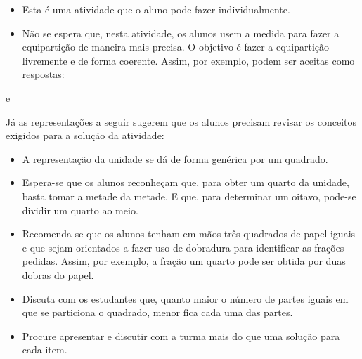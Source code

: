 \begin{multicols}{2}
  \begin{itemize} %
    \item       Esta é uma atividade que o aluno pode fazer individualmente.
    \item       Não se espera que, nesta atividade, os alunos usem a medida para fazer a equipartição de maneira mais precisa. O objetivo é fazer a equipartição livremente e de forma coerente. Assim, por exemplo, podem ser aceitas como respostas:
\end{itemize} %
\begin{center}
e
\end{center}
  Já as representações a seguir sugerem que os alunos precisam revisar os conceitos exigidos para a solução da atividade:
\begin{center}
\end{center}
\begin{itemize} %
    \item       A representação da unidade se dá de forma genérica por um quadrado.
    \item       Espera-se que os alunos reconheçam que, para obter um quarto da unidade, basta tomar a metade da metade. E que, para determinar um oitavo, pode-se dividir um quarto ao meio.
    \item       Recomenda-se que os alunos tenham em mãos três quadrados de papel iguais e que sejam orientados a fazer uso de dobradura para identificar as frações pedidas. Assim, por exemplo, a fração um quarto pode ser obtida por duas dobras do papel.
    \item Discuta com os estudantes que, quanto maior o número de partes iguais em que se particiona o quadrado, menor fica cada uma das partes.
    \item Procure apresentar e discutir com a turma mais do que uma solução para cada item.

\end{itemize}
\end{multicols}

